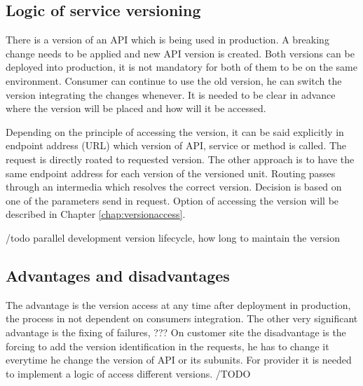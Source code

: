 

\subsection{Logic of service versioning}
There is a version of an API which is being used in production. A breaking change needs to be applied and new API version is created. Both versions can be deployed into production, it is not mandatory for both of them to be on the same environment. Consumer can continue to use the old version, he can switch the version integrating the changes whenever. It is needed to be clear in advance where the version will be placed and how will it be accessed.

Depending on the principle of accessing the version, it can be said explicitly in endpoint address (URL) which version of API, service or method is called. The request is directly roated to requested version. The other approach is to have the same endpoint address for each version of the versioned unit. Routing passes through an intermedia which resolves the correct version. Decision is based on one of the parameters send in request. Option of accessing the version will be described in Chapter \ref{chap:versionaccess}.

/todo
parallel development
version lifecycle, how long to maintain the version

\subsection{Advantages and disadvantages}
The advantage is the version access at any time after deployment in production, the process in not dependent on consumers integration. The other very significant advantage is the fixing of failures, ???
On customer site the disadvantage is the forcing to add the version identification in the requests, he has to change it everytime he change the version of API or its subunits. For provider it is needed to implement a logic of access different versions.
/TODO
